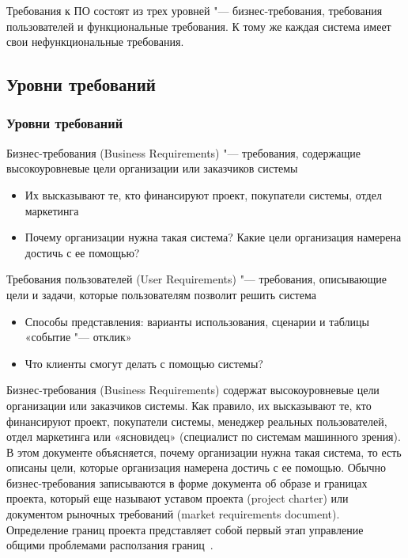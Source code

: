\documentclass{../industrial-development}
\begin{document}
\lecturenotes

Требования к ПО состоят из трех уровней "--- бизнес-требования, требования пользователей и функциональные требования. К тому же каждая система имеет свои нефункциональные требования.


\subsection{Уровни требований}
\begin{frame} \frametitle{Уровни требований}
  \begin{block}{}
\alert{Бизнес-требования} (Business Requirements) "--- требования, содержащие высокоуровневые цели организации или заказчиков системы
  \end{block}
   \begin{itemize}
\item Их высказывают те, кто финансируют проект, покупатели системы, отдел маркетинга
\item Почему организации нужна такая система? Какие цели организация намерена достичь с ее помощью?
\end{itemize}
  \begin{block}{}
\alert{Требования пользователей} (User Requirements) "--- требования, описывающие цели и задачи, которые пользователям позволит решить система 
    \end{block}
 \begin{itemize}
	\item Способы представления: варианты использования, сценарии и таблицы «событие "--- отклик»
	\item Что клиенты смогут делать с помощью системы?
  \end{itemize}
\end{frame}

\lecturenotes

\alert{Бизнес-требования (Business Requirements)} содержат высокоуровневые цели организации или заказчиков системы. Как правило, их высказывают те, кто финансируют проект, покупатели системы, менеджер реальных пользователей, отдел маркетинга или «ясновидец» (специалист по системам машинного зрения). В этом документе объясняется, почему организации нужна такая система, то есть описаны цели, которые организация намерена достичь с ее помощью. Обычно бизнес-требования записываются в форме документа об образе и границах проекта, который еще называют уставом проекта (project charter) или документом рыночных требований (market requirements document).
Определение границ проекта представляет собой первый этап управление общими проблемами расползания границ~\cite[с.~7]{Wiegers}.
\end{document}
